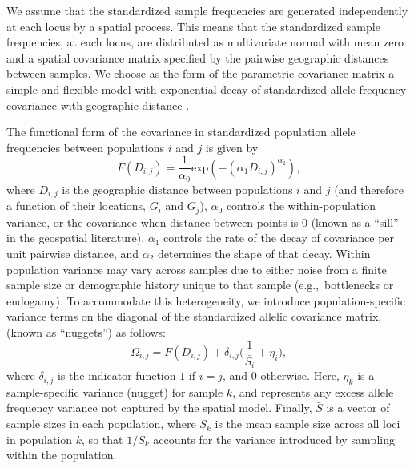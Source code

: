 \documentclass[12pt]{article}
\begin{document}
We assume that the standardized sample frequencies are generated independently at each locus by a spatial process.  
This means that the standardized sample frequencies, at each locus, are distributed as multivariate normal with mean zero and a spatial covariance matrix specified by the pairwise geographic distances between samples. We choose as the form of the parametric covariance matrix a simple and flexible model with exponential decay of standardized allele frequency covariance with geographic distance \citep{Diggle1998, Wasser2004, Bradburd2013}.

The functional form of the covariance in standardized population allele frequencies between populations $i$ and $j$ is given by 
\begin{equation}
\label{eq:spatial_covariance}
F(D_{i,j}) = \frac{1}{\alpha_0} \text{exp} \left(	-\left(\alpha_1D_{i,j} \right)^{\alpha_2} \right) \text{,}
\end{equation}
where $D_{i,j}$ is the geographic distance 
between populations $i$ and $j$ (and therefore a function of their locations, $G_i$ and $G_j$), $\alpha_0$ controls the within-population variance, or the covariance when distance between points is 0 
(known as a ``sill'' in the geospatial literature),
$\alpha_1$ controls the rate of the decay of covariance per unit pairwise distance, and $\alpha_2$ determines the shape of that decay.  Within population variance may vary across samples due to either noise from a finite sample size or demographic history unique to that sample (e.g.,\ bottlenecks or endogamy).  
To accommodate this heterogeneity, we introduce population-specific variance terms on the diagonal of the standardized allelic covariance matrix, 
(known as ``nuggets'')
as follows:  
\begin{equation}
\label{eq:spatial_covariance2}
\Omega_{i,j} =F(D_{i,j}) + \delta_{i,j} \big(\frac{1}{\bar{S_{i}}} + \eta_{i} \big) \text{,}
\end{equation} 
where $\delta_{i,j}$ is the indicator function $1$ if $i=j$, and $0$ otherwise. 
Here, $\eta_k$ is a sample-specific variance (nugget) for sample $k$, 
and represents any excess allele frequency variance not captured by the spatial model.
Finally, $\bar{S}$ is a vector of sample sizes in each population, where $\bar{S}_k$ is the mean sample size across all loci in population $k$,
so that $1/\bar{S_k}$ accounts for the variance introduced by sampling within the population.
\end{document}
